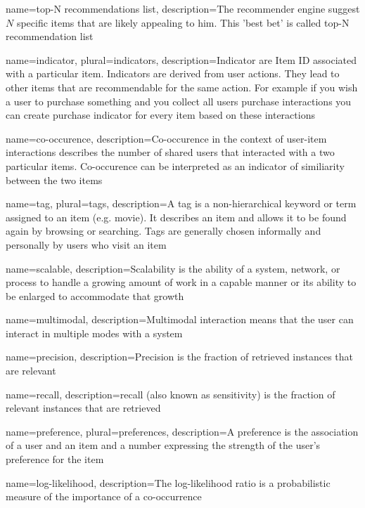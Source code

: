 {
name=top-N recommendations list,
description={The recommender engine suggest $N$ specific items that are likely appealing to him. This 'best bet' is called top-N recommendation list}
}

{
name={indicator},
plural={indicators},
description={Indicator are Item ID associated with a particular item. Indicators are derived from user actions. They lead to other items that are recommendable for the same action. For example if you wish a user to purchase something and you collect all users purchase interactions you can create purchase indicator for every item based on these interactions}
}

{
name={co-occurence},
description={Co-occurence in the context of user-item interactions describes the number of shared users that interacted with a two particular items. Co-occurence can be interpreted as an indicator of similiarity between the two items}
}

{
name={tag},
plural={tags},
description={A tag is a non-hierarchical keyword or term assigned to an item (e.g. movie). It describes an item and allows it to be found again by browsing or searching. Tags are generally chosen informally and personally by users who visit an item}
}

{
name={scalable},
description={Scalability is the ability of a system, network, or process to handle a growing amount of work in a capable manner or its ability to be enlarged to accommodate that growth}
}

{
name={multimodal},
description={Multimodal interaction means that the user can interact in multiple modes with a system}
}

{
name={precision},
description={Precision is the fraction of retrieved instances that are relevant}
}

{
name={recall},
description={recall (also known as sensitivity) is the fraction of relevant instances that are retrieve}d 
}

{
name={preference},
plural={preferences},
description={A preference is the association of a user and an item and a number expressing the strength of the user's preference for the item}
}

{
name={log-likelihood},
description={The log-likelihood ratio is a probabilistic measure of the importance of a co-occurrence}
}

